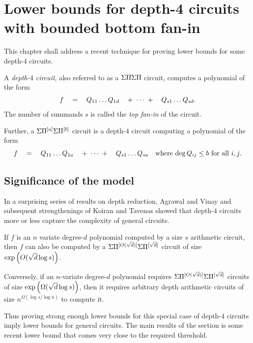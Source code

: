 \chapter{Lower bounds for depth-4 circuits with bounded bottom fan-in}
\label{chap:d4-bottomfanin}

This chapter shall address a recent technique for proving lower bounds for some depth-$4$ circuits. 

\begin{definition}
  A \emph{depth-$4$ circuit}, also referred to as a $\Sigma\Pi\Sigma\Pi$ circuit, computes a polynomial of the form 
  $$
  f \quad = \quad Q_{11}\dots Q_{1d} \quad +\;\cdots\;+ \quad  Q_{s1}\dots Q_{sd}.
  $$
  The number of summands $s$ is called the \emph{top fan-in} of the circuit. 

  Further, a $\Sigma\Pi^{[a]}\Sigma\Pi^{[b]}$ circuit is a depth-$4$ circuit computing a polynomial of the form
  $$
  f \quad = \quad Q_{11}\dots Q_{1a} \quad +\;\cdots\;+ \quad  Q_{s1}\dots Q_{sa}\quad\text{where $\deg Q_{ij} \leq b$ for all $i,j$}.
  $$
\end{definition}

\section{Significance of the model}

In a surprising series of results on depth reduction, Agrawal and Vinay \cite{av08} and subsequent strengthenings of Koiran \cite{koiran} and Tavenas \cite{Tav13} showed that depth-$4$ circuits more or less capture the complexity of general circuits. 

\begin{theorem} 
  If $f$ is an $n$ variate degree-$d$ polynomial computed by a size $s$ arithmetic circuit, then $f$ can also be computed by a $\Sigma\Pi^{[O(\sqrt{d})]}\Sigma\Pi^{[\sqrt{d}]}$ circuit of size $\exp\left(O(\sqrt{d}\log s)\right)$. 
  
  Conversely, if an $n$-variate degree-$d$ polynomial requires $\Sigma\Pi^{[O(\sqrt{d})]}\Sigma\Pi^{[\sqrt{d}]}$  circuits of size $\exp\left(\Omega(\sqrt{d}\log s)\right)$, then it requires arbitrary depth arithmetic circuits of size $n^{\Omega(\log s / \log n)}$ to compute it. 
\end{theorem}

Thus proving strong enough lower bounds for this special case of depth-$4$ circuits imply lower bounds for general circuits. 
The main results of the section is some recent lower bound \cite{gkks13,KSS13,FLMS13} that comes very close to the required threshold. 

